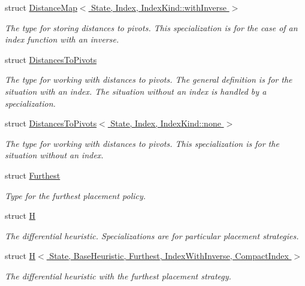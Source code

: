 \begin{DoxyCompactItemize}
struct \hyperlink{structslb_1_1ext_1_1heuristic_1_1differential_1_1DistanceMap_3_01State_00_01Index_00_01IndexKind_1_1withInverse_01_4}{Distance\+Map$<$ State, Index, Index\+Kind\+::with\+Inverse $>$}
\begin{DoxyCompactList}\small\item\em The type for storing distances to pivots. This specialization is for the case of an index function with an inverse. \end{DoxyCompactList}\item 
struct \hyperlink{structslb_1_1ext_1_1heuristic_1_1differential_1_1DistancesToPivots}{Distances\+To\+Pivots}
\begin{DoxyCompactList}\small\item\em The type for working with distances to pivots. The general definition is for the situation with an index. The situation without an index is handled by a specialization. \end{DoxyCompactList}\item 
struct \hyperlink{structslb_1_1ext_1_1heuristic_1_1differential_1_1DistancesToPivots_3_01State_00_01Index_00_01IndexKind_1_1none_01_4}{Distances\+To\+Pivots$<$ State, Index, Index\+Kind\+::none $>$}
\begin{DoxyCompactList}\small\item\em The type for working with distances to pivots. This specialization is for the situation without an index. \end{DoxyCompactList}\item 
struct \hyperlink{structslb_1_1ext_1_1heuristic_1_1differential_1_1Furthest}{Furthest}
\begin{DoxyCompactList}\small\item\em Type for the furthest placement policy. \end{DoxyCompactList}\item 
struct \hyperlink{structslb_1_1ext_1_1heuristic_1_1differential_1_1H}{H}
\begin{DoxyCompactList}\small\item\em The differential heuristic. Specializations are for particular placement strategies. \end{DoxyCompactList}\item 
struct \hyperlink{structslb_1_1ext_1_1heuristic_1_1differential_1_1H_3_01State_00_01BaseHeuristic_00_01Furthest_0071671274a92eae86902a47a514057667}{H$<$ State, Base\+Heuristic, Furthest, Index\+With\+Inverse, Compact\+Index $>$}
\begin{DoxyCompactList}\small\item\em The differential heuristic with the furthest placement strategy. \end{DoxyCompactList}\item 

\end{DoxyCompactItemize}
